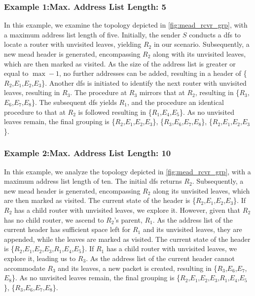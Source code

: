 \subsubsection{Example 1:\quad Max. Address List Length: 5} %
\label{sec:Max 5}
In this example, we examine the topology depicted in \autoref{fig:mead_rcvr_grp},
    with a maximum address list length of five.
Initially, the sender $S$ conducts a \gls{dfs} to locate a router with unvisited
    leaves, yielding $R_2$ in our scenario.
Subsequently, a new \gls{mead} header is generated, encompassing $R_2$ along
    with its unvisited leaves, which are then marked as visited.
As the size of the address list is greater or equal to $\max-1$, no further
    addresses can be added, resulting in a header of \{$R_2$,$E_1$,$E_2$,$E_3$\}.
Another \gls{dfs} is initiated to identify the next router with unvisited leaves,
    resulting in $R_3$.
The procedure at $R_3$ mirrors that at $R_2$, resulting in
    \{$R_3$,$E_6$,$E_7$,$E_8$\}.
The subsequent \gls{dfs} yields $R_1$, and the procedure an identical procedure
    to that at $R_2$ is followed resulting in \{$R_1$,$E_4$,$E_5$\}.
As no unvisited leaves remain, the final grouping is \{$R_2$,$E_1$,$E_2$,$E_3$\},
    \{$R_3$,$E_6$,$E_7$,$E_8$\}, \{$R_2$,$E_1$,$E_2$,$E_3$\}.

\subsubsection{Example 2:\quad Max. Address List Length: 10} %
\label{sec:Max 10}
In this example, we analyze the topology depicted in \autoref{fig:mead_rcvr_grp},
    with a maximum address list length of ten.
The initial \gls{dfs} returns $R_2$.
Subsequently, a new \gls{mead} header is generated, encompassing $R_2$ along its
    unvisited leaves, which are then marked as visited.
The current state of the header is \{$R_2$,$E_1$,$E_2$,$E_3$\}.
If $R_2$ has a child router with unvisited leaves, we explore it.
However, given that $R_2$ has no child router, we ascend to $R_2$'s parent, $R_1$.
As the address list of the current header has sufficient space left for $R_1$
    and its unvisited leaves, they are appended, while the leaves are marked as
    visited.
The current state of the header is \{$R_2$,$E_1$,$E_2$,$E_3$,$R_1$,$E_4$,$E_5$\}.
If $R_1$ has a child router with unvisited leaves, we explore it, leading us to
    $R_3$.
As the address list of the current header cannot accommodate $R_3$ and its
    leaves, a new packet is created, resulting in \{$R_3$,$E_6$,$E_7$,$E_8$\}.
As no unvisited leaves remain, the final grouping is
    \{$R_2$,$E_1$,$E_2$,$E_3$,$R_1$,$E_4$,$E_5$\}, \{$R_3$,$E_6$,$E_7$,$E_8$\}.

